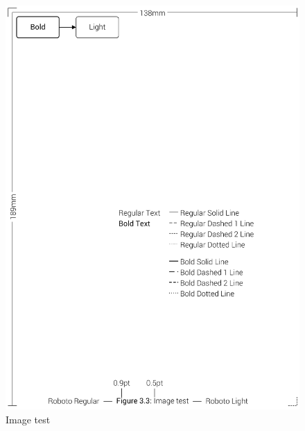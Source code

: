 \begin{figure}[!htbp]
	\centering
	\includegraphics[resolution=600]{test/assets/image_test}
	\caption{Image test}
\end{figure}
